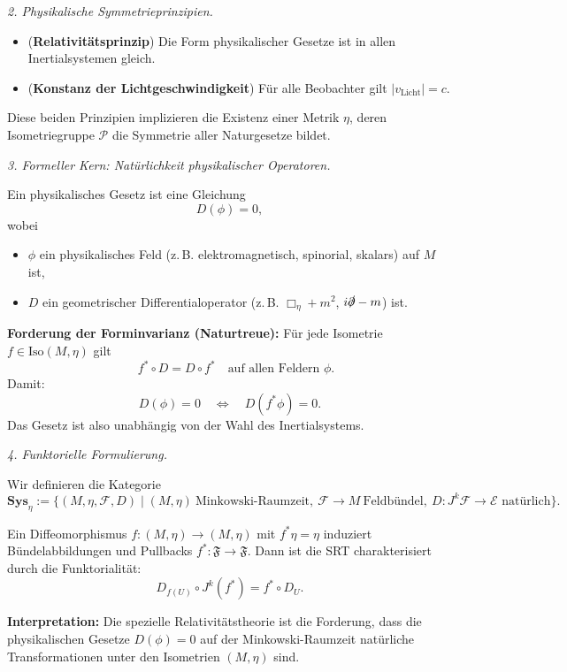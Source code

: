 \documentclass[10pt, letterpaper]{article}
\begin{document}
\bigskip
\emph{2. Physikalische Symmetrieprinzipien.}
\begin{itemize}
\item (\textbf{Relativitätsprinzip})  
Die Form physikalischer Gesetze ist in allen Inertialsystemen gleich.
\item (\textbf{Konstanz der Lichtgeschwindigkeit})  
Für alle Beobachter gilt $|v_{\text{Licht}}| = c$.
\end{itemize}
Diese beiden Prinzipien implizieren die Existenz einer Metrik $\eta$, deren Isometriegruppe
$\mathcal P$ die Symmetrie aller Naturgesetze bildet.

\bigskip
\emph{3. Formeller Kern: Natürlichkeit physikalischer Operatoren.}

Ein physikalisches Gesetz ist eine Gleichung
\[
D(\phi) = 0,
\]
wobei
\begin{itemize}
\item $\phi$ ein physikalisches Feld (z.\,B. elektromagnetisch, spinorial, skalars) auf $M$ ist,
\item $D$ ein geometrischer Differentialoperator (z.\,B. $\Box_\eta+m^2$, $i\slashed{\partial}-m$) ist.
\end{itemize}

\textbf{Forderung der Forminvarianz (Naturtreue):}
Für jede Isometrie $f\in\mathrm{Iso}(M,\eta)$ gilt
\[
\boxed{
\quad f^*\circ D = D\circ f^* \quad
\text{auf allen Feldern }\phi.
}
\]
Damit:
\[
D(\phi)=0 \quad\Longleftrightarrow\quad D(f^*\phi)=0.
\]
Das Gesetz ist also unabhängig von der Wahl des Inertialsystems.

\bigskip
\emph{4. Funktorielle Formulierung.}

Wir definieren die Kategorie
\[
\mathbf{Sys}_{\eta} :=
\{(M,\eta,\mathcal F,D)\mid (M,\eta)\ \text{Minkowski-Raumzeit},\ 
\mathcal F\to M\ \text{Feldbündel},\ D:J^k\mathcal F\to \mathcal E \text{ natürlich}\}.
\]

Ein Diffeomorphismus $f:(M,\eta)\to(M,\eta)$ mit $f^*\eta=\eta$ 
induziert Bündelabbildungen und Pullbacks $f^*:\mathfrak F\to\mathfrak F$.
Dann ist die SRT charakterisiert durch die Funktorialität:
\[
D_{f(U)}\circ J^k(f^*) = f^*\circ D_U.
\]

\textbf{Interpretation:}  
Die spezielle Relativitätstheorie ist die Forderung, dass die physikalischen 
Gesetze $D(\phi)=0$ auf der Minkowski-Raumzeit natürliche Transformationen unter 
den Isometrien $(M,\eta)$ sind.
\end{document}
